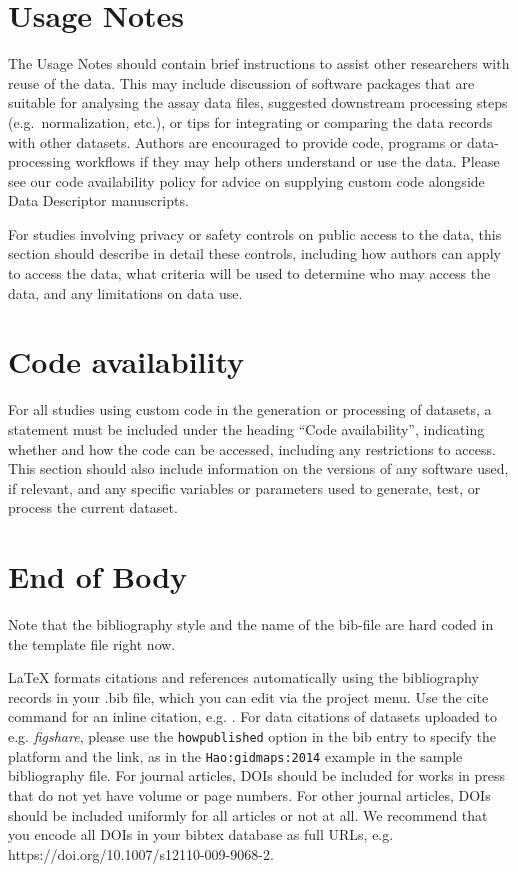 \documentclass[fleqn,10pt]{wlscirep}
\begin{document}
\section*{Usage Notes}

The Usage Notes should contain brief instructions to assist other
researchers with reuse of the data. This may include discussion of
software packages that are suitable for analysing the assay data files,
suggested downstream processing steps (e.g.~normalization, etc.), or
tips for integrating or comparing the data records with other datasets.
Authors are encouraged to provide code, programs or data-processing
workflows if they may help others understand or use the data. Please see
our code availability policy for advice on supplying custom code
alongside Data Descriptor manuscripts.

For studies involving privacy or safety controls on public access to the
data, this section should describe in detail these controls, including
how authors can apply to access the data, what criteria will be used to
determine who may access the data, and any limitations on data use.

\section*{Code availability}

For all studies using custom code in the generation or processing of
datasets, a statement must be included under the heading ``Code
availability'', indicating whether and how the code can be accessed,
including any restrictions to access. This section should also include
information on the versions of any software used, if relevant, and any
specific variables or parameters used to generate, test, or process the
current dataset.

\section{End of Body}\label{end-of-body}

Note that the bibliography style and the name of the bib-file are hard
coded in the template file right now.



\noindent LaTeX formats citations and references automatically using the bibliography records in your .bib file, which you can edit via the project menu. Use the cite command for an inline citation, e.g. \cite{Kaufman2020, Figueredo:2009dg, Babichev2002, behringer2014manipulating}. For data citations of datasets uploaded to e.g. \emph{figshare}, please use the \verb|howpublished| option in the bib entry to specify the platform and the link, as in the \verb|Hao:gidmaps:2014| example in the sample bibliography file. For journal articles, DOIs should be included for works in press that do not yet have volume or page numbers. For other journal articles, DOIs should be included uniformly for all articles or not at all. We recommend that you encode all DOIs in your bibtex database as full URLs, e.g. https://doi.org/10.1007/s12110-009-9068-2.
\end{document}
